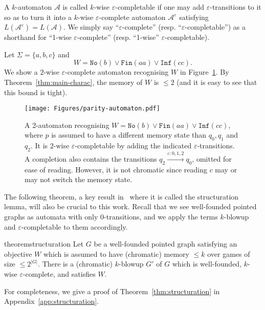\documentclass[a4paper,UKenglish,cleveref, thm-restate]{lipics-v2021}
\newcommand{\re}[1]{\xrightarrow{#1}}
\newcommand{\eps}{\varepsilon}
\newcommand{\A}{\mathcal{A}}
\newcommand{\infOften}{{\mathtt{Inf}}}
\newcommand{\finOften}{\mathtt{Fin}}
\newcommand{\noOcc}{\mathtt{No}}
\begin{document}
A $k$-automaton $\A$ is called $k$-wise $\eps$-completable if one may add $\eps$-transitions to it so as to turn it into a $k$-wise $\eps$-complete automaton $\A^\eps$ satisfying $L(\A^\eps)=L(\A)$.
We simply say ``$\eps$-complete'' (resp. ``$\eps$-completable'') as a shorthand for ``1-wise $\eps$-complete'' (resp. ``1-wise'' $\eps$-completable).


\begin{example}
    Let $\Sigma = \{a, b,c\}$ and 
    \[W = \noOcc(b) \vee \finOften(aa) \vee \infOften(cc).\]
    We show a $2$-wise $\eps$-complete automaton recognising $W$ in Figure~\ref{fig:aut-eps-complete}. By Theorem~\ref{thm:main-charac}, the memory of $W$ is $\leq 2$ (and it is easy to see that this bound is tight).


    \begin{figure}[h]
        \centering
        \texttt{[image: Figures/parity-automaton.pdf]}
        \caption{A 2-automaton recognising $W=\noOcc(b) \vee \finOften(aa) \vee \infOften(cc)$, where $p$ is assumed to have a different memory state than $q_0,q_1$ and $q_2$. It is $2$-wise $\eps$-completable by adding the indicated $\eps$-transitions. A completion also contains the transitions $q_2\re{\eps:0,1,2} q_0$, omitted for ease of reading. However, it is not chromatic since reading $c$ may or may not switch the memory state.}
        \label{fig:aut-eps-complete}
    \end{figure}
\end{example}




The following theorem, a key result in~\cite{CO25LMCS} where it is called the structuration lemma, will also be crucial to this work.
Recall that we see well-founded pointed graphs as automata with only $0$-transitions, and we apply the terms $k$-blowup and $\eps$-completable to them accordingly.

\begin{restatable}{theorem}{structuration}
    \label{thm:structuration}
    Let $G$ be a well-founded pointed graph satisfying an objective $W$ which is assumed to have (chromatic) memory $\leq k$ over games of size $\leq 2^{|G|}$.
    There is a (chromatic) $k$-blowup $G'$ of $G$ which is well-founded, $k$-wise $\eps$-complete, and satisfies $W$.
\end{restatable}

For completeness, we give a proof of Theorem~\ref{thm:structuration} in Appendix~\ref{app:structuration}.
\end{document}

